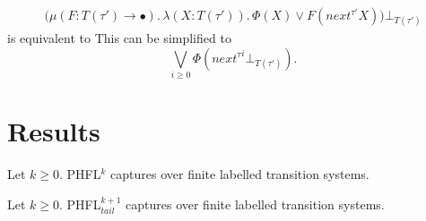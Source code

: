 \begin{frame}

    \begin{align*}
        \big(\mu (F \colon T(\tau') \rightarrow \bullet).\, \lambda (X \colon T(\tau')).\,
        \Phi(X)
        \vee F(next^{\tau'} X)\big)\bot_{T(\tau')}
    \end{align*}    
     is equivalent to
     {This can be simplified to
    \[\underset{i\geq0}{\bigvee} \Phi({next^{\tau}}^i \bot_{T(\tau')}).\]}

\end{frame}

\section{Results}

\begin{frame}

\begin{theorem}
    Let $k \geq 0$. PHFL$^k$ captures  over finite labelled transition systems.
\end{theorem}

\begin{theorem}
    Let $k \geq 0$. PHFL$^{k+1}_{tail}$ captures  over finite labelled transition systems.
\end{theorem}

\end{frame}